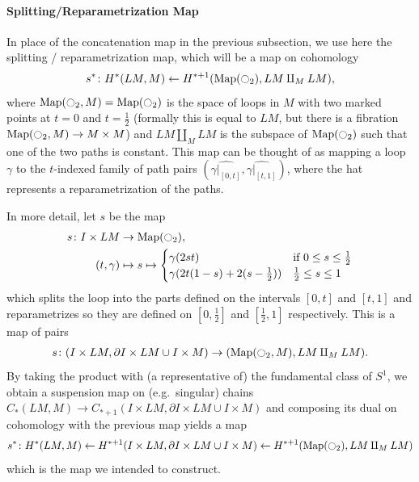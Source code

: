 \documentclass{scrartcl}
\theoremstyle{plain}
\theoremstyle{definition}
\newcommand{\union}{\mathbin{\cup}}
\newcommand{\from}{\leftarrow}
\DeclareMathOperator{\Map}{Map}
\renewcommand{\coprod}{\mathbin{\amalg}}
\begin{document}
\paragraph{Splitting/Reparametrization Map} In place of the concatenation map in the previous subsection, we use here the splitting / reparametrization map, which will be a map on cohomology
\begin{align*}
    s^*\colon H^{*}(LM, M) \from H^{*+1}(\Map(\ocircle_2), LM\coprod_M LM),
\end{align*}
where $\Map(\ocircle_2, M) = \Map(\ocircle_2)$ is the space of loops in $M$ with two marked points at $t=0$ and $t=\frac 12$ (formally this is equal to $LM$, but there is a fibration $\Map(\ocircle_2, M)\to M\times M$) and $LM\coprod_M LM$ is the subspace of $\Map(\ocircle_2)$ such that one of the two paths is constant. This map can be thought of as mapping a loop $\gamma$ to the $t$-indexed family of path pairs $(\widehat{\gamma|_{[0, t]}}, \widehat{\gamma|_{[t, 1]}})$, where the hat represents a reparametrization of the paths. 

In more detail, let $s$ be the map 
\begin{align*}
    s\colon I\times LM & \to\Map(\ocircle_2),\\
    (t, \gamma) &\mapsto s\mapsto \begin{cases}
        \gamma(2 st) & \text{if}\ 0 \leq s \leq \frac 12\\
        \gamma(2t(1-s)+2(s-\frac 12))& \frac 12\leq s \leq 1
    \end{cases}
\end{align*}
which splits the loop into the parts defined on the intervals $[0, t]$ and $[t, 1]$ and reparametrizes so they are defined on $[0, \frac 12]$ and $[\frac 12, 1]$ respectively. This is a map of pairs
\begin{align*}
    s\colon (I\times LM, \partial I\times LM \union I\times M) \to (\Map(\ocircle_2, M), LM\coprod_M LM).
\end{align*} 
By taking the product with (a representative of) the fundamental class of $S^1$, we obtain a suspension map on (e.g.\ singular) chains $ C_{*}(LM, M) \to C_{*+1}(I\times LM, \partial I \times LM \union I\times M)$ and composing its dual on cohomology with the previous map yields a map 
\begin{align*}
    s^*\colon H^{*}(LM, M) \from H^{*+1}(I\times LM, \partial I \times LM \union I\times M) \from H^{*+1}(\Map(\ocircle_2), LM\coprod_M LM)
\end{align*}
which is the map we intended to construct.
\end{document}
